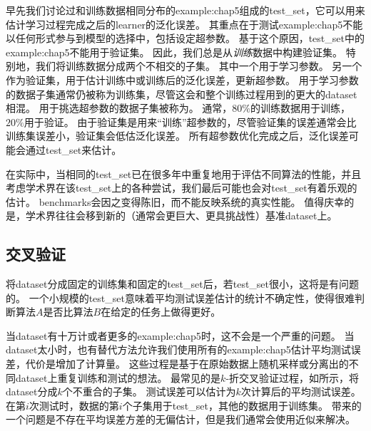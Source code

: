早先我们讨论过和训练数据相同分布的\gls{example:chap5}组成的\gls{test_set}，它可以用来估计学习过程完成之后的\gls{learner}的泛化误差。
其重点在于测试\gls{example:chap5}不能以任何形式参与到模型的选择中，包括设定超参数。
基于这个原因，\gls{test_set}中的\gls{example:chap5}不能用于验证集。
因此，我们总是从\emph{训练}数据中构建验证集。
特别地，我们将训练数据分成两个不相交的子集。
其中一个用于学习参数。
另一个作为验证集，用于估计训练中或训练后的泛化误差，更新超参数。
用于学习参数的数据子集通常仍被称为训练集，尽管这会和整个训练过程用到的更大的\gls{dataset}相混。
用于挑选超参数的数据子集被称为。
通常，$80\%$的训练数据用于训练，$20\%$用于验证。
由于验证集是用来``训练''超参数的，尽管验证集的误差通常会比训练集误差小，验证集会低估泛化误差。
所有超参数优化完成之后，泛化误差可能会通过\gls{test_set}来估计。

在实际中，当相同的\gls{test_set}已在很多年中重复地用于评估不同算法的性能，并且考虑学术界在该\gls{test_set}上的各种尝试，我们最后可能也会对\gls{test_set}有着乐观的估计。
\gls{benchmarks}会因之变得陈旧，而不能反映系统的真实性能。
值得庆幸的是，学术界往往会移到新的（通常会更巨大、更具挑战性）基准\gls{dataset}上。

\subsection{交叉验证}
\label{sec:cross_validation}
将\gls{dataset}分成固定的训练集和固定的\gls{test_set}后，若\gls{test_set}很小，这将是有问题的。
一个小规模的\gls{test_set}意味着平均测试误差估计的统计不确定性，使得很难判断算法$A$是否比算法$B$在给定的任务上做得更好。


当\gls{dataset}有十万计或者更多的\gls{example:chap5}时，这不会是一个严重的问题。
当\gls{dataset}太小时，也有替代方法允许我们使用所有的\gls{example:chap5}估计平均测试误差，代价是增加了计算量。
这些过程是基于在原始数据上随机采样或分离出的不同\gls{dataset}上重复训练和测试的想法。
最常见的是$k$-折交叉验证过程，如所示，将\gls{dataset}分成$k$个不重合的子集。
测试误差可以估计为$k$次计算后的平均测试误差。
在第$i$次测试时，数据的第$i$个子集用于\gls{test_set}，其他的数据用于训练集。
带来的一个问题是不存在平均误差方差的无偏估计\citep{Bengio-Grandvalet-JMLR-04}，但是我们通常会使用近似来解决。

